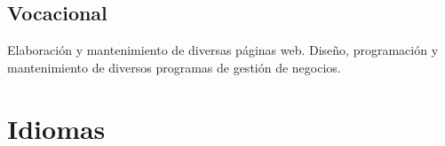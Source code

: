 \documentclass[11pt,a4paper,sans]{moderncv}
\begin{document}
\subsection{Vocacional}
{Elaboración y mantenimiento de diversas páginas web.\newline{}}
{Diseño, programación y mantenimiento de diversos programas de gestión de negocios.\newline{}}


\section{Idiomas}

\end{document}

